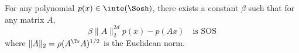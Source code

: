 \begin{lemma}
  \label{lem:sosbound}
  For any polynomial $p(x) \in \inte(\Sosh)$,
  there exists a constant $\beta$
  such that for any matrix $A$,
  \[ \beta\|A\|_2^{2d} p(x) - p(Ax) \quad \text{is SOS} \]
  where $\|A\|_2 = \rho(A^\Tr A)^{1/2}$ is the Euclidean norm.
\end{lemma}
